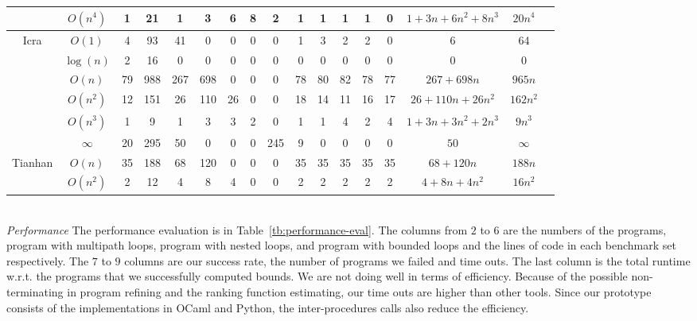\begin{table}[ht]
{\begin{tabular}{ c | c | c | c | c | c | c | c | c | c | c | c | c | c | c | c | c |}
 \cline{2-2}
 & $O(n^{4})$ & 1 & 21 & 1 & 3 & 6 & 8 & 2  & 1 & 1 & 1 & 1 & 0 & $1+3n+6n^2+8n^3$ & $20n^4$\\
 \hline \hline
 \multirow{6}{*}{Icra} 
 & $O(1)$ & 4 & 93 & 41 & 0 & 0 & 0 & 0  & 1 & 3 & 2 & 2 & 0 & 6 & 64 \\
 \cline{2-2}
 & $\log(n)$ & 2 & 16 & 0 & 0 & 0 & 0 & 0  & 0 & 0 & 0 & 0 & 0 & 0 & 0 \\
 \cline{2-2}
 & $O(n)$ & 79 & 988 & 267 & 698 & 0 & 0 & 0  & 78 & 80 & 82 & 78 & 77 & $267 + 698n$ & $ 965n $\\
 \cline{2-2}
 & $O(n^2)$ & 12 & 151 & 26 & 110 & 26 & 0 & 0  & 18 & 14 & 11 & 16 & 17 & $26+110n+26n^2$ & $162n^2$\\
 \cline{2-2}
 & $O(n^3)$ & 1 &  9 & 1 & 3 & 3 & 2 & 0  & 1 & 1 & 4 & 2 & 4 & $1+3n+3n^2+2n^3$ & $9n^3$\\
 \cline{2-2}
 & $\infty$ & 20 & 295 &  50 & 0 & 0 & 0  & 245 & 9 & 0 & 0 & 0 & 0 & $50$ & $ \infty$\\
 \hline \hline
 \multirow{2}{*}{Tianhan} 
 & $O(n)$ & 35 & 188 & 68 & 120 & 0 & 0 &  0 & 35 & 35 & 35 & 35 & 35 & $68+120n$ & $188n$\\
 \cline{2-2}
 & $O(n^2)$ & 2 & 12 & 4 & 8 & 4 & 0 & 0 & 2 & 2 & 2 & 2 & 2 & $4+8n+4n^2$ & $16n^2$ \\
 \hline
 \end{tabular}
 }
 \vspace{-0.8cm}
 \end{table}
%
\\
\emph{Performance}
The performance evaluation is in Table~\ref{tb:performance-eval}.
The columns from $2$ to $6$ are the numbers of the programs, program with multipath loops, program with nested loops, and program with bounded loops and the lines of code in each benchmark set respectively.
The $7$ to $9$ columns are our success rate, the number of programs we failed and time outs. The last column is the total runtime w.r.t. the programs that we successfully computed bounds.
We are not doing well in terms of efficiency. Because of the possible non-terminating in program refining and the ranking function estimating, our time outs are higher than other tools.
Since our prototype consists of the implementations in OCaml and Python, the inter-procedures calls also reduce the efficiency.
%
%
